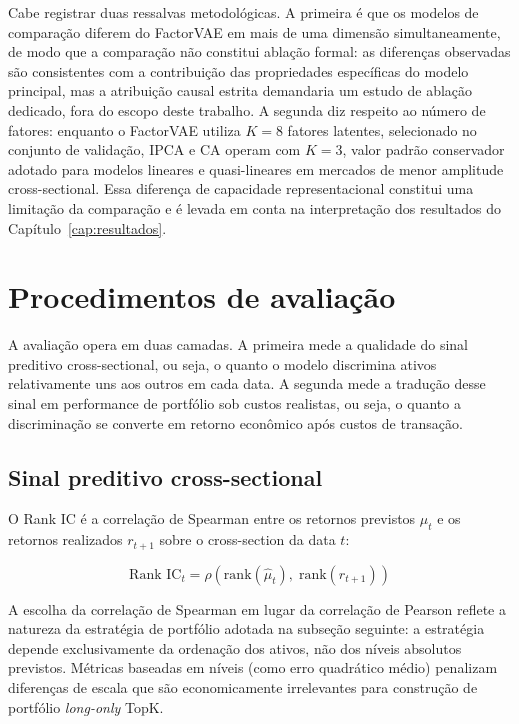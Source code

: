 Cabe registrar duas ressalvas metodológicas. A primeira é que os modelos de comparação
diferem do FactorVAE em mais de uma dimensão simultaneamente, de modo que a comparação
não constitui ablação formal: as diferenças observadas são consistentes com a
contribuição das propriedades específicas do modelo principal, mas a atribuição causal
estrita demandaria um estudo de ablação dedicado, fora do escopo deste trabalho. A
segunda diz respeito ao número de fatores: enquanto o FactorVAE utiliza $K = 8$ fatores
latentes, selecionado no conjunto de validação, IPCA e CA operam com $K = 3$, valor
padrão conservador adotado para modelos lineares e quasi-lineares em mercados de
menor amplitude cross-sectional. Essa diferença de capacidade representacional constitui
uma limitação da comparação e é levada em conta na interpretação dos resultados do
Capítulo~\ref{cap:resultados}.


\section{Procedimentos de avaliação}
\label{sec:avaliacao}

A avaliação opera em duas camadas. A primeira mede a qualidade do sinal preditivo
cross-sectional, ou seja, o quanto o modelo discrimina ativos relativamente uns aos
outros em cada data. A segunda mede a tradução desse sinal em performance de portfólio
sob custos realistas, ou seja, o quanto a discriminação se converte em retorno econômico
após custos de transação.


\subsection{Sinal preditivo cross-sectional}
\label{subsec:avaliacao-skill}

O Rank IC é a correlação de Spearman entre os retornos previstos $\hat{\mu}_t$ e os
retornos realizados $r_{t+1}$ sobre o cross-section da data $t$:

\begin{equation}
    \text{Rank IC}_t = \rho\!\left(\text{rank}(\hat{\mu}_t),\; \text{rank}(r_{t+1})
    \right)
    \label{eq:rank-ic}
\end{equation}

A escolha da correlação de Spearman em lugar da correlação de Pearson reflete a
natureza da estratégia de portfólio adotada na subseção seguinte: a estratégia depende
exclusivamente da ordenação dos ativos, não dos níveis absolutos previstos. Métricas
baseadas em níveis (como erro quadrático médio) penalizam diferenças de escala que são
economicamente irrelevantes para construção de portfólio \textit{long-only} TopK.

